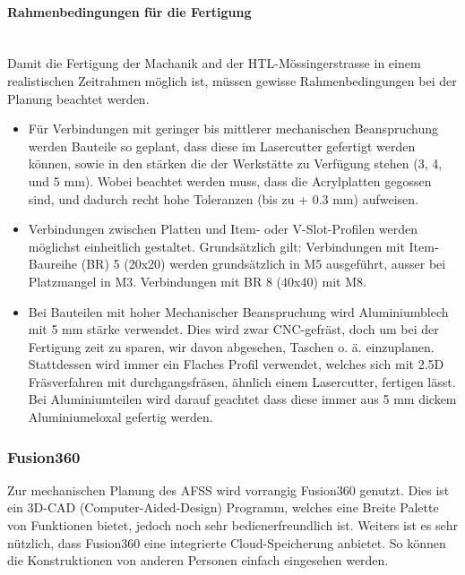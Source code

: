 \paragraph{Rahmenbedingungen für die Fertigung}\mbox{}\\
Damit die Fertigung der Machanik and der HTL-Mössingerstrasse in einem realistischen Zeitrahmen möglich ist, müssen gewisse Rahmenbedingungen bei der Planung beachtet werden.
\begin{itemize}
    \item Für Verbindungen mit geringer bis mittlerer mechanischen Beanspruchung werden Bauteile so geplant, dass diese im Lasercutter gefertigt werden können, sowie in den stärken die der Werkstätte zu Verfügung stehen (3, 4, und 5 mm). Wobei beachtet werden muss, dass die Acrylplatten gegossen sind, und dadurch recht hohe Toleranzen (bis zu + 0.3 mm) aufweisen.
    \item Verbindungen zwischen Platten und Item- oder V-Slot-Profilen werden möglichst einheitlich gestaltet. Grundsätzlich gilt: Verbindungen mit Item-Baureihe (BR) 5 (20x20) werden grundsätzlich in M5 ausgeführt, ausser bei Platzmangel in M3. Verbindungen mit BR 8 (40x40) mit M8. 
    \item Bei Bauteilen mit hoher Mechanischer Beanspruchung wird Aluminiumblech mit 5 mm stärke verwendet. Dies wird zwar CNC-gefräst, doch um bei der Fertigung zeit zu sparen, wir davon abgesehen, Taschen o. ä. einzuplanen. Stattdessen wird immer ein Flaches Profil verwendet, welches sich mit 2.5D Fräsverfahren mit durchgangsfräsen, ähnlich einem Lasercutter, fertigen lässt. Bei Aluminiumteilen wird darauf geachtet dass diese immer aus 5 mm dickem Aluminiumeloxal gefertig werden.
\end{itemize}

\subsubsection{Fusion360}
Zur mechanischen Planung des AFSS wird vorrangig Fusion360 genutzt. Dies ist ein 3D-CAD (Computer-Aided-Design) Programm, welches eine Breite Palette von Funktionen bietet, jedoch noch sehr bedienerfreundlich ist. Weiters ist es sehr nützlich, dass Fusion360 eine integrierte Cloud-Speicherung anbietet. So können die Konstruktionen von anderen Personen einfach eingesehen werden. 

